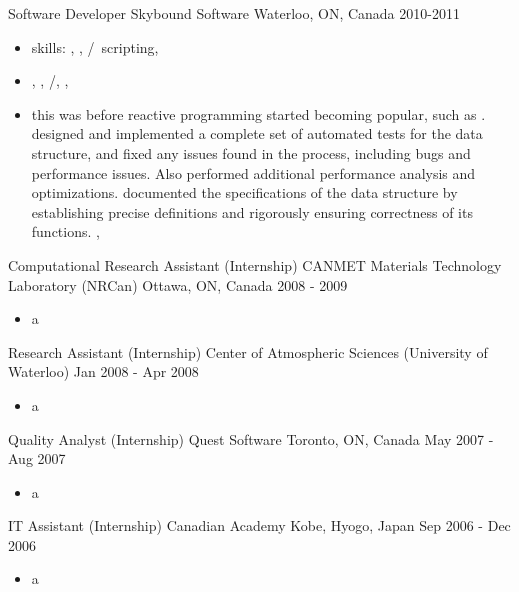   \cventry
    {Software Developer} %
    {Skybound Software} %
    {Waterloo, ON, Canada} %
    {2010-2011} %
    {
      \begin{itemize} %
        \item {skills: \rfcsharp, \rftypescript, \rfhtml/\rfcss \rfbash \ scripting, \rfaws}
        \item{
        \tgskills \rfcsharp, \rftypescript, \rfhtml/\rfcss, \rfbash, \rfaws
        }
        \item{
        this was before reactive programming started becoming popular, such as \rfreact.
        \tgsubitem designed and implemented a complete set of automated tests for the data structure, 
        and fixed any issues found in the process, including bugs and performance issues. 
        Also performed additional performance analysis and optimizations.
        \tgsubitem documented the specifications of the data structure by establishing precise definitions and rigorously ensuring correctness of its functions.
        \tgskills \rfcsharp, \rflatex
        }
      \end{itemize}
    }

  \cventry
    {Computational Research Assistant (Internship)} %
    {CANMET Materials Technology Laboratory (NRCan)} %
    {Ottawa, ON, Canada} %
    {2008 - 2009} %
    {
      \begin{itemize} %
        \item {a}
      \end{itemize}
    }

  \cventry
    {Research Assistant (Internship)} %
    {Center of Atmospheric Sciences (University of Waterloo)} %
    {Jan 2008 - Apr 2008} %
    {} %
    {
      \begin{itemize} %
        \item {a}
      \end{itemize}
    }

  \cventry
    {Quality Analyst (Internship)} %
    {Quest Software} %
    {Toronto, ON, Canada} %
    {May 2007 - Aug 2007} %
    {
      \begin{itemize} %
        \item {a}
      \end{itemize}
    }
  \cventry
    {IT Assistant (Internship)} %
    {Canadian Academy} %
    {Kobe, Hyogo, Japan} %
    {Sep 2006 - Dec 2006} %
    {
      \begin{itemize} %
        \item {a}
      \end{itemize}
    }
